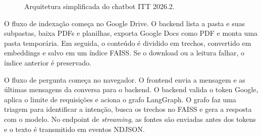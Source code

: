\documentclass[12pt,a4paper]{article}
\begin{document}
\begin{figure}[htbp]
\centering
{}
\caption{Arquitetura simplificada do chatbot ITT 2026.2.}
\label{fig:arquitetura}
\end{figure}

O fluxo de indexação começa no Google Drive. O backend lista a pasta e suas
subpastas, baixa PDFs e planilhas, exporta Google Docs como PDF e monta uma pasta
temporária. Em seguida, o conteúdo é dividido em trechos, convertido em embeddings
e salvo em um índice FAISS. Se o download ou a leitura falhar, o índice anterior é
preservado.

O fluxo de pergunta começa no navegador. O frontend envia a mensagem e as últimas
mensagens da conversa para o backend. O backend valida o token Google, aplica o
limite de requisições e aciona o grafo LangGraph. O grafo faz uma triagem para
identificar a intenção, busca os trechos no FAISS e gera a resposta com o modelo.
No endpoint de \emph{streaming}, as fontes são enviadas antes dos tokens e o texto
é transmitido em eventos NDJSON.
\end{document}
